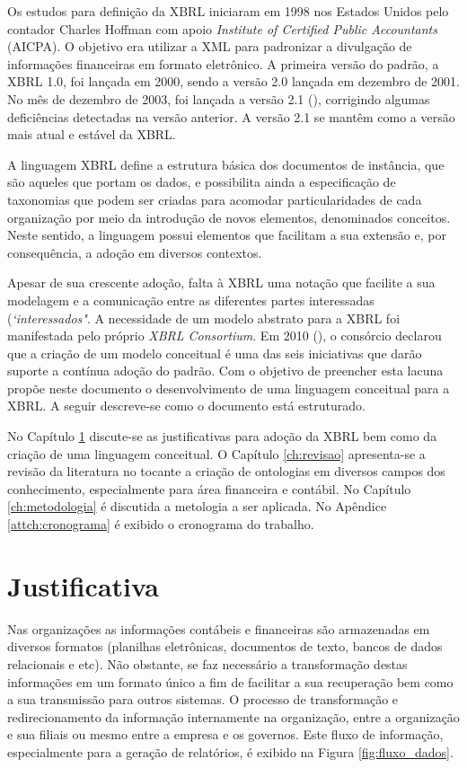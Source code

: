\documentclass[msc,proposal,hidelot,hideabstract]{ppgccufmg} %
\begin{document}
Os estudos para definição da XBRL iniciaram em 1998 nos Estados Unidos pelo contador Charles Hoffman com apoio \textit{Institute of Certified Public Accountants} (AICPA). O objetivo era utilizar a XML para padronizar a divulgação de informações financeiras em formato eletrônico. A primeira versão do padrão, a XBRL 1.0, foi lançada em 2000, sendo a versão 2.0 lançada em dezembro de 2001. No mês de dezembro de 2003, foi lançada a versão 2.1 (\cite{hoffman_2006}), corrigindo algumas deficiências detectadas na versão anterior. A versão 2.1 se mantêm como a versão mais atual e estável da XBRL.

A linguagem XBRL define a estrutura básica dos documentos de instância, que são aqueles que portam os dados, e possibilita ainda a especificação de taxonomias que podem ser criadas para acomodar particularidades de cada organização por meio da introdução de novos elementos, denominados conceitos. Neste sentido, a linguagem possui elementos que facilitam a sua extensão e, por consequência, a adoção em diversos contextos.

Apesar de sua crescente adoção, falta à XBRL uma notação que facilite a sua modelagem e a comunicação entre as diferentes partes interessadas (\textit{`interessados"}. A necessidade de um modelo abstrato para a XBRL foi manifestada pelo próprio \textit{XBRL Consortium}. Em 2010 (\cite{xbrl_preserve_promote_particite}), o consórcio declarou que a criação de um modelo conceitual é uma das seis iniciativas que darão suporte a contínua adoção do padrão. Com o objetivo de preencher esta lacuna propõe neste documento o desenvolvimento de uma linguagem conceitual para a XBRL. A seguir descreve-se como o documento está estruturado.

No Capítulo \ref{ch:justificativa} discute-se as justificativas para adoção da XBRL bem como da criação de uma linguagem conceitual. O Capítulo \ref{ch:revisao} apresenta-se a revisão da literatura no tocante a criação de ontologias em diversos campos dos conhecimento, especialmente para área financeira e contábil. No Capítulo \ref{ch:metodologia} é discutida a metologia a ser aplicada. No Apêndice \ref{attch:cronograma} é exibido o cronograma do trabalho.

\chapter{Justificativa}
\label{ch:justificativa}

Nas organizações as informações contábeis e financeiras são armazenadas em diversos formatos (planilhas eletrônicas, documentos de texto, bancos de dados relacionais e etc). Não obstante, se faz necessário a transformação destas informações em um formato único a fim de facilitar a sua recuperação bem como a sua transmissão para outros sistemas. O processo de transformação e redirecionamento da informação internamente na organização, entre a organização e sua filiais ou mesmo entre a empresa e os governos. Este fluxo de informação, especialmente para a geração de relatórios, é exibido na Figura \ref{fig:fluxo_dados}.
\end{document}
